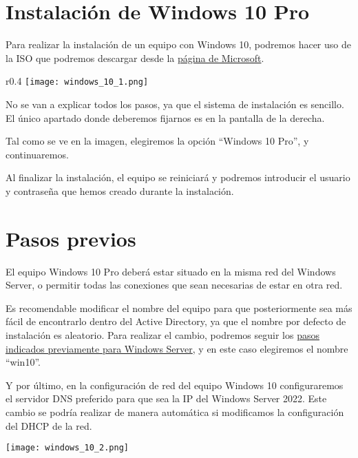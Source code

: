 \section{Instalación de Windows 10 Pro}
Para realizar la instalación de un equipo con Windows 10, podremos hacer uso de la ISO que podremos descargar desde la \href{https://www.microsoft.com/es-es/software-download/windows10ISO}{página de Microsoft}.

\begin{wrapfigure}{r}{0.4\linewidth}
    \centering
    \vspace{-10pt}
    \texttt{[image: windows\_10\_1.png]}
    \vspace{-40pt}
\end{wrapfigure}


No se van a explicar todos los pasos, ya que el sistema de instalación es sencillo. El único apartado donde deberemos fijarnos es en la pantalla de la derecha.

Tal como se ve en la imagen, elegiremos la opción “Windows 10 Pro”, y continuaremos.

Al finalizar la instalación, el equipo se reiniciará y podremos introducir el usuario y contraseña que hemos creado durante la instalación.


\hypertarget{pasos_previos_windows_cliente}{}
\section{Pasos previos}
El equipo Windows 10 Pro deberá estar situado en la misma red del Windows Server, o permitir todas las conexiones que sean necesarias de estar en otra red.

Es recomendable modificar el nombre del equipo para que posteriormente sea más fácil de encontrarlo dentro del Active Directory, ya que el nombre por defecto de instalación es aleatorio. Para realizar el cambio, podremos seguir los \hyperlink{cambiar_nombre_equipo}{pasos indicados previamente para Windows Server}, y en este caso elegiremos el nombre “win10”.

Y por último, en la configuración de red del equipo Windows 10 configuraremos el servidor DNS preferido para que sea la IP del Windows Server 2022. Este cambio se podría realizar de manera automática si modificamos la configuración del DHCP de la red.

\begin{center}
    \texttt{[image: windows\_10\_2.png]}
\end{center}

